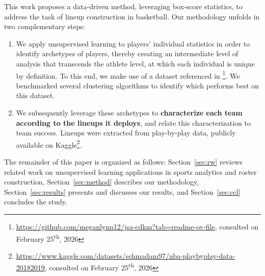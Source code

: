 This work proposes a data-driven method, leveraging box-score statistics, to address the task of lineup construction in basketball.
Our methodology unfolds in two complementary steps:

\begin{enumerate}
  \item We apply unsupervised learning to players' individual statistics in order to identify archetypes of players, thereby creating an intermediate level of analysis that transcends the athlete level, at which each individual is unique by definition.
  To this end, we make use of a dataset referenced in \cite{muniz_weighted_2022}\footnote{\url{https://github.com/meganlynn12/jsa-cdkm?tab=readme-ov-file}, consulted on February 25\textsuperscript{th}, 2026}.
  We benchmarked several clustering algorithms to identify which performs best on this dataset.
  \item We subsequently leverage these archetypes to \textbf{characterize each team according to the lineups it deploys}, and relate this characterization to team success.
  Lineups were extracted from play-by-play data, publicly available on Kaggle\footnote{\url{https://www.kaggle.com/datasets/schmadam97/nba-playbyplay-data-20182019}, consulted on February 25\textsuperscript{th}, 2026}.
\end{enumerate}

The remainder of this paper is organized as follows: Section~\ref{sec:rw} reviews related work on unsupervised learning applications in sports analytics and roster construction, Section~\ref{sec:method} describes our methodology, Section~\ref{sec:results} presents and discusses our results, and Section~\ref{sec:ccl} concludes the study.
